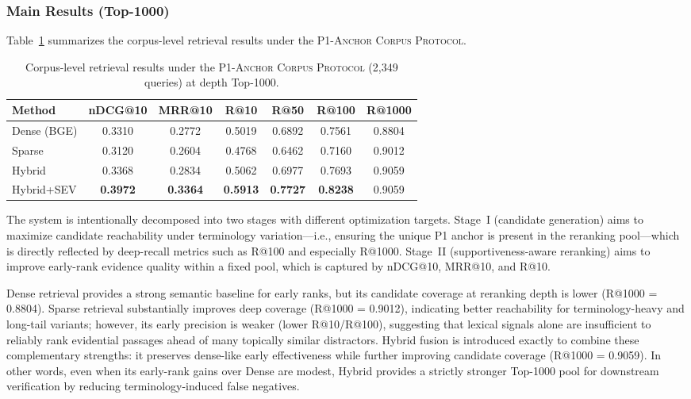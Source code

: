 \documentclass[preprint,12pt,a4paper]{elsarticle}
\begin{document}
\subsubsection{Main Results (Top-1000)}
\label{subsubsec:exp_main_results}
Table~\ref{tab:main_top1000} summarizes the corpus-level retrieval results under the \textsc{P1-Anchor Corpus Protocol}.

\begin{table}[t]
  \centering
  \caption{Corpus-level retrieval results under the \textsc{P1-Anchor Corpus Protocol} (2,349 queries) at depth Top-1000.}
  \label{tab:main_top1000}
  \small
  \setlength{\tabcolsep}{3.5pt}
  \begin{tabular*}{\textwidth}{@{\extracolsep{\fill}}lcccccc@{}}
    \toprule
    \textbf{Method} & \textbf{nDCG@10} & \textbf{MRR@10} & \textbf{R@10} & \textbf{R@50} & \textbf{R@100} & \textbf{R@1000} \\
    \midrule
    Dense (BGE) & 0.3310 & 0.2772 & 0.5019 & 0.6892 & 0.7561 & 0.8804 \\
    Sparse & 0.3120 & 0.2604 & 0.4768 & 0.6462 & 0.7160 & 0.9012 \\
    Hybrid & 0.3368 & 0.2834 & 0.5062 & 0.6977 & 0.7693 & 0.9059 \\
    Hybrid+SEV & \textbf{0.3972} & \textbf{0.3364} & \textbf{0.5913} & \textbf{0.7727} & \textbf{0.8238} & 0.9059 \\
    \bottomrule
  \end{tabular*}
\end{table}

The system is intentionally decomposed into two stages with different optimization targets.
Stage~I (candidate generation) aims to maximize candidate reachability under terminology variation---i.e., ensuring the unique P1 anchor is present in the reranking pool---which is directly reflected by deep-recall metrics such as R@100 and especially R@1000.
Stage~II (supportiveness-aware reranking) aims to improve early-rank evidence quality within a fixed pool, which is captured by nDCG@10, MRR@10, and R@10.

Dense retrieval provides a strong semantic baseline for early ranks, but its candidate coverage at reranking depth is lower (R@1000 = 0.8804).
Sparse retrieval substantially improves deep coverage (R@1000 = 0.9012), indicating better reachability for terminology-heavy and long-tail variants; however, its early precision is weaker (lower R@10/R@100), suggesting that lexical signals alone are insufficient to reliably rank evidential passages ahead of many topically similar distractors.
Hybrid fusion is introduced exactly to combine these complementary strengths: it preserves dense-like early effectiveness while further improving candidate coverage (R@1000 = 0.9059).
In other words, even when its early-rank gains over Dense are modest, Hybrid provides a strictly stronger Top-1000 pool for downstream verification by reducing terminology-induced false negatives.
\end{document}
